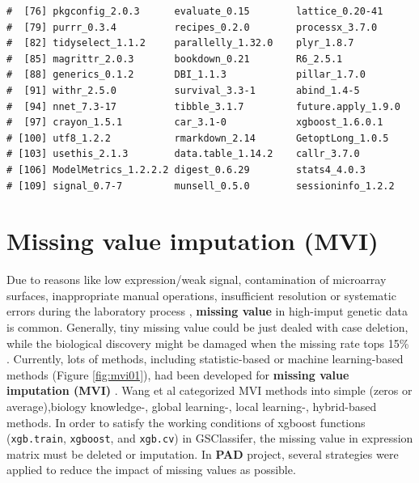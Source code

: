 \documentclass[
  12pt,
]{book}
\begin{document}
\begin{verbatim}
#  [76] pkgconfig_2.0.3      evaluate_0.15        lattice_0.20-41     
#  [79] purrr_0.3.4          recipes_0.2.0        processx_3.7.0      
#  [82] tidyselect_1.1.2     parallelly_1.32.0    plyr_1.8.7          
#  [85] magrittr_2.0.3       bookdown_0.21        R6_2.5.1            
#  [88] generics_0.1.2       DBI_1.1.3            pillar_1.7.0        
#  [91] withr_2.5.0          survival_3.3-1       abind_1.4-5         
#  [94] nnet_7.3-17          tibble_3.1.7         future.apply_1.9.0  
#  [97] crayon_1.5.1         car_3.1-0            xgboost_1.6.0.1     
# [100] utf8_1.2.2           rmarkdown_2.14       GetoptLong_1.0.5    
# [103] usethis_2.1.3        data.table_1.14.2    callr_3.7.0         
# [106] ModelMetrics_1.2.2.2 digest_0.6.29        stats4_4.0.3        
# [109] signal_0.7-7         munsell_0.5.0        sessioninfo_1.2.2
\end{verbatim}

\hypertarget{missing-value-imputation-mvi}{%
\section{Missing value imputation (MVI)}\label{missing-value-imputation-mvi}}

Due to reasons like low expression/weak signal, contamination of microarray surfaces, inappropriate manual operations, insufficient resolution or systematic errors during the laboratory process \citep{RN387, RN389, RN382}, \textbf{missing value} in high-imput genetic data is common. Generally, tiny missing value could be just dealed with case deletion, while the biological discovery might be damaged when the missing rate tops 15\% \citep{RN392, RN386}. Currently, lots of methods, including statistic-based or machine learning-based methods (Figure \ref{fig:mvi01}), had been developed for \textbf{missing value imputation (MVI)} \citep{RN386}. Wang et al \citep{RN384} categorized MVI methods into simple (zeros or average),biology knowledge-, global learning-, local learning-, hybrid-based methods. In order to satisfy the working conditions of xgboost \citep{xgboost} functions (\texttt{xgb.train}, \texttt{xgboost}, and \texttt{xgb.cv}) in GSClassifer, the missing value in expression matrix must be deleted or imputation. In \textbf{PAD} project, several strategies were applied to reduce the impact of missing values as possible.
\end{document}

